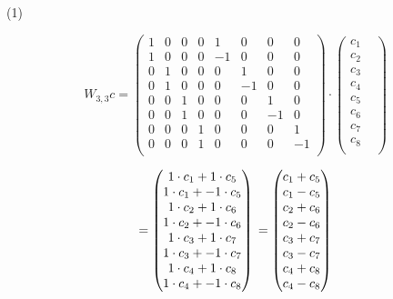 \documentclass[12pt]{article}
\begin{document}
\medskip
(1)

\[
W_{3, 3} c =
\begin{pmatrix}
1  &  0  &  0 & 0 & 1   &  0   & 0    & 0  \\
1  &  0  &  0 & 0 & -1 &  0   & 0    & 0  \\
0   &  1  &  0 & 0 &  0  & 1   & 0    & 0  \\
0   &  1  &  0 & 0 &  0  & -1 & 0    & 0  \\
0   &  0  &  1 & 0 &  0  &  0  & 1    & 0  \\
0   &  0  &  1 & 0 &  0  &  0  & -1  & 0  \\
0   &  0  &  0 & 1 &  0  &  0  & 0    & 1  \\
0   &  0  &  0 & 1 &  0  &  0  & 0    & -1  \\
\end{pmatrix}
\cdot
\begin{pmatrix}
c_1 & \\
c_2 & \\
c_3 & \\
c_4 & \\
c_5 & \\
c_6 & \\
c_7 & \\
c_8 \\
\end{pmatrix}
\]

\[
= 
\begin{pmatrix}
1 \cdot c_1 + 1 \cdot c_5 \\
1 \cdot c_1 + -1 \cdot c_5 \\
1 \cdot c_2 + 1 \cdot c_6 \\
1 \cdot c_2 + -1 \cdot c_6\\
1 \cdot c_3 + 1 \cdot c_7 \\
1 \cdot c_3 + - 1 \cdot c_7 \\
1 \cdot c_4 + 1 \cdot c_8 \\
1 \cdot c_4 + -1 \cdot c_8 \\
\end{pmatrix}
\\ 
= 
\begin{pmatrix}
c_1 + c_5 \\
c_1 - c_5 \\
c_2 + c_6 \\
c_2 - c_6\\
c_3 + c_7 \\
c_3 - c_7 \\
c_4 + c_8 \\
c_4 - c_8 \\
\end{pmatrix}
\]
\end{document}
